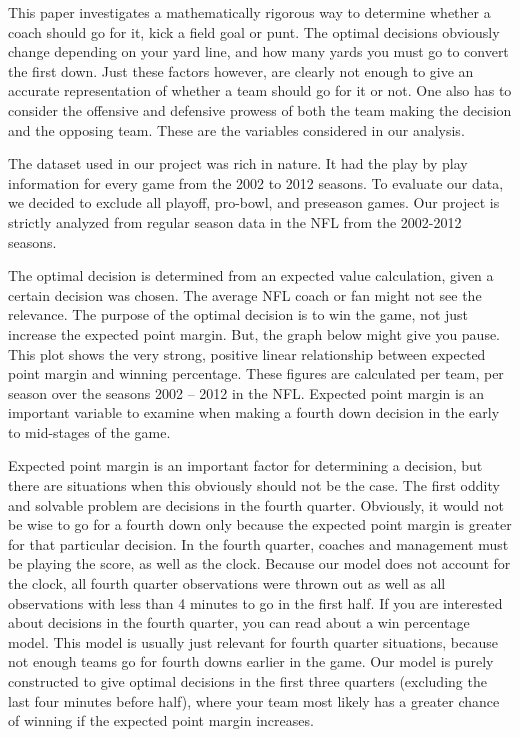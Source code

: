 \documentclass[letterpaper,10pt,english]{/anaconda/lib/python2.7/site-packages/sphinx/texinputs/sphinxhowto}
\begin{document}
This paper investigates a mathematically rigorous way to determine
whether a coach should go for it, kick a field goal or punt. The optimal
decisions obviously change depending on your yard line, and how many
yards you must go to convert the first down. Just these factors however,
are clearly not enough to give an accurate representation of whether a
team should go for it or not. One also has to consider the offensive and
defensive prowess of both the team making the decision and the opposing
team. These are the variables considered in our analysis.

The dataset used in our project was rich in nature. It had the play by
play information for every game from the 2002 to 2012 seasons. To
evaluate our data, we decided to exclude all playoff, pro-bowl, and
preseason games. Our project is strictly analyzed from regular season
data in the NFL from the 2002-2012 seasons.

The optimal decision is determined from an expected value calculation,
given a certain decision was chosen. The average NFL coach or fan might
not see the relevance. The purpose of the optimal decision is to win the
game, not just increase the expected point margin. But, the graph below
might give you pause. This plot shows the very strong, positive linear
relationship between expected point margin and winning percentage. These
figures are calculated per team, per season over the seasons 2002 --
2012 in the NFL. Expected point margin is an important variable to
examine when making a fourth down decision in the early to mid-stages of
the game.

Expected point margin is an important factor for determining a decision,
but there are situations when this obviously should not be the case. The
first oddity and solvable problem are decisions in the fourth quarter.
Obviously, it would not be wise to go for a fourth down only because the
expected point margin is greater for that particular decision. In the
fourth quarter, coaches and management must be playing the score, as
well as the clock. Because our model does not account for the clock, all
fourth quarter observations were thrown out as well as all observations
with less than 4 minutes to go in the first half. If you are interested
about decisions in the fourth quarter, you can read about a win
percentage model. This model is usually just relevant for fourth quarter
situations, because not enough teams go for fourth downs earlier in the
game. Our model is purely constructed to give optimal decisions in the
first three quarters (excluding the last four minutes before half),
where your team most likely has a greater chance of winning if the
expected point margin increases.
\end{document}

